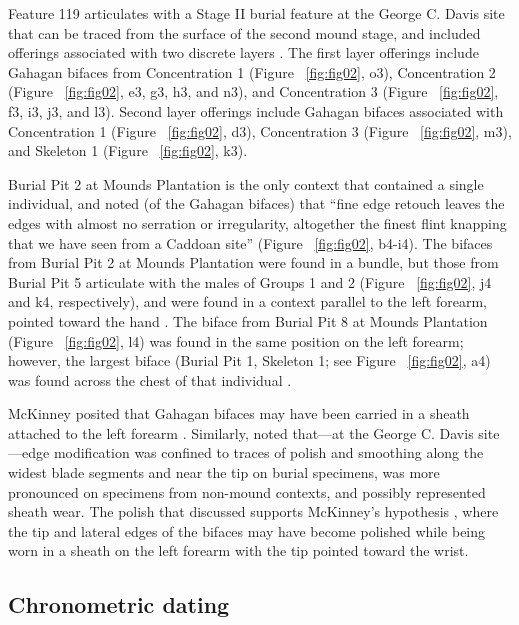 \documentclass[review]{elsarticle}
\begin{document}
Feature 119 \citep[Figure 13-18]{RN808} articulates with a Stage II burial feature at the George C. Davis site that can be traced from the surface of the second mound stage, and included offerings associated with two discrete layers \citep{RN808,RN5050,RN806}. The first layer offerings include Gahagan bifaces from Concentration 1 (Figure ~\ref{fig:fig02}, o3), Concentration 2 (Figure ~\ref{fig:fig02}, e3, g3, h3, and n3), and Concentration 3 (Figure ~\ref{fig:fig02}, f3, i3, j3, and l3). Second layer offerings include Gahagan bifaces associated with Concentration 1 (Figure ~\ref{fig:fig02}, d3), Concentration 3 (Figure ~\ref{fig:fig02}, m3), and Skeleton 1 (Figure ~\ref{fig:fig02}, k3). 

Burial Pit 2 at Mounds Plantation is the only context that contained a single individual, and \citet[97]{RN11561} noted (of the Gahagan bifaces) that “fine edge retouch leaves the edges with almost no serration or irregularity, altogether the finest flint knapping that we have seen from a Caddoan site” (Figure ~\ref{fig:fig02}, b4-i4). The bifaces from Burial Pit 2 at Mounds Plantation were found in a bundle, but those from Burial Pit 5 articulate with the males of Groups 1 and 2 (Figure ~\ref{fig:fig02}, j4 and k4, respectively), and were found in a context parallel to the left forearm, pointed toward the hand \citep[Figure 5]{RN11561}. The biface from Burial Pit 8 at Mounds Plantation (Figure ~\ref{fig:fig02}, l4) was found in the same position on the left forearm; however, the largest biface (Burial Pit 1, Skeleton 1; see Figure ~\ref{fig:fig02}, a4) was found across the chest of that individual \citep{RN11561}.

McKinney posited that Gahagan bifaces may have been carried in a sheath attached to the left forearm \citep{RN11561}. Similarly, \citet{RN3684} noted that---at the George C. Davis site---edge modification was confined to traces of polish and smoothing along the widest blade segments and near the tip on burial specimens, was more pronounced on specimens from non-mound contexts, and possibly represented sheath wear. The polish that \citet{RN3684} discussed supports McKinney’s hypothesis \citep{RN11561}, where the tip and lateral edges of the bifaces may have become polished while being worn in a sheath on the left forearm with the tip pointed toward the wrist.

\subsection*{Chronometric dating}
\end{document}
